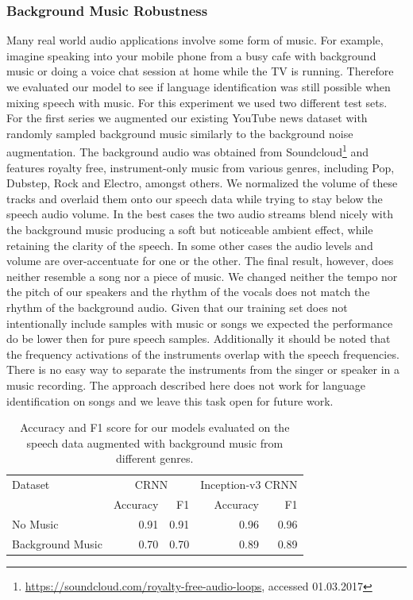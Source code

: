 \subsubsection{Background Music Robustness} 
\label{sec:music_robustness}
Many real world audio applications involve some form of music. For example, imagine speaking into your mobile phone from a busy cafe with background music or doing a voice chat session at home while the TV is running. Therefore we evaluated our model to see if language identification was still possible when mixing speech with music. For this experiment we used two different test sets. For the first series we augmented our existing YouTube news dataset with randomly sampled background music similarly to the background noise augmentation. The background audio was obtained from Soundcloud\footnote{\url{https://soundcloud.com/royalty-free-audio-loops}, accessed 01.03.2017} and features royalty free, instrument-only music from various genres, including Pop, Dubstep, Rock and Electro, amongst others. 
We normalized the volume of these tracks and overlaid them onto our speech data while trying to stay below the speech audio volume. In the best cases the two audio streams blend nicely with the background music producing a soft but noticeable ambient effect, while retaining the clarity of the speech. In some other cases the audio levels and volume are over-accentuate for one or the other. The final result, however, does neither resemble a song nor a piece of music. We changed neither the tempo nor the pitch of our speakers and the rhythm of the vocals does not match the rhythm of the background audio. Given that our training set does not intentionally include samples with music or songs we expected the performance do be lower then for pure speech samples. Additionally it should be noted that the frequency activations of the instruments overlap with the speech frequencies. There is no easy way to separate the instruments from the singer or speaker in a music recording. The approach described here does not work for language identification on songs and we leave this task open for future work. 
	\begin{table}[]
	\centering
	\begin{tabularx}{\textwidth}{lrrrr}
	\toprule
Dataset & \multicolumn{2}{c}{CRNN} & \multicolumn{2}{c}{Inception-v3 CRNN} \\   
                  & Accuracy  & F1    & Accuracy   & F1   \\ \midrule
No Music		  & 0.91		  & 0.91	  & 0.96	  & 0.96 \\                     
Background Music  & 0.70      & 0.70  & 0.89  & 0.89 \\
 	\bottomrule
	\end{tabularx}
	\caption{Accuracy and F1 score for our models evaluated on the speech data augmented with background music from different genres.}
	\label{tab:audio_duration}
	\end{table}

